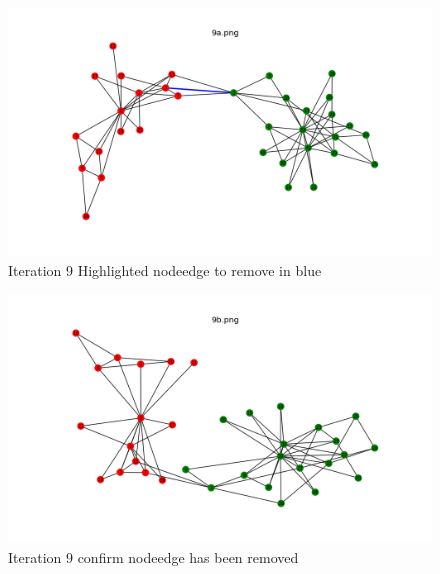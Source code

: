 \documentclass[12pt]{article}
\begin{document}
\begin{figure}[H]
\centering
\includegraphics[trim=0 0 0 0, clip, width=\textwidth] {9a.png}
\caption{Iteration 9 Highlighted nodeedge to remove in blue }
\label{fig:q19a}
\end{figure}
\begin{figure}[H]
\centering
\includegraphics[trim=0 0 0 0, clip, width=\textwidth] {9b.png}
\caption{Iteration 9 confirm nodeedge has been removed }
\label{fig:q19b}
\end{figure}
\end{document}

